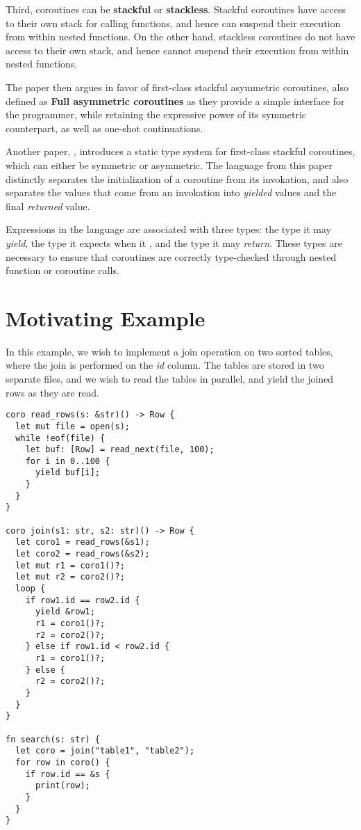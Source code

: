 \documentclass[review,twocolumn,preprint]{sigplanconf}
\begin{document}
Third, coroutines can be \textbf{stackful} or \textbf{stackless}. Stackful coroutines have access to their own stack for calling functions, and hence can suspend their execution from within nested functions. On the other hand, stackless coroutines do not have access to their own stack, and hence cannot suspend their execution from within nested functions.

The paper then argues in favor of first-class stackful asymmetric coroutines, also defined as \textbf{Full asymmetric coroutines} as they provide a simple interface for the programmer, while retaining the expressive power of its symmetric counterpart, as well as one-shot continuations.

Another paper, \citet{konrad2011}, introduces a static type system for first-class stackful coroutines, which can either be symmetric or asymmetric. The language from this paper distinctly separates the initialization of a coroutine from its invokation, and also separates the values that come from an invokation into \textit{yielded} values and the final \textit{returned} value.

Expressions in the language are associated with three types: the type it may \textit{yield}, the type it expects when it , and the type it may \textit{return}. These types are necessary to ensure that coroutines are correctly type-checked through nested function or coroutine calls.

\section{Motivating Example}



In this example, we wish to implement a join operation on two sorted tables, where the join is performed on the \textit{id} column. The tables are stored in two separate files, and we wish to read the tables in parallel, and yield the joined rows as they are read.

\begin{verbatim}
coro read_rows(s: &str)() -> Row {
  let mut file = open(s);
  while !eof(file) {
    let buf: [Row] = read_next(file, 100);
    for i in 0..100 {
      yield buf[i];
    }
  }
}

coro join(s1: str, s2: str)() -> Row {
  let coro1 = read_rows(&s1);
  let coro2 = read_rows(&s2);
  let mut r1 = coro1()?;
  let mut r2 = coro2()?;
  loop {
    if row1.id == row2.id {
      yield &row1;
      r1 = coro1()?;
      r2 = coro2()?;
    } else if row1.id < row2.id {
      r1 = coro1()?;
    } else {
      r2 = coro2()?;
    }
  }
}

fn search(s: str) {
  let coro = join("table1", "table2");
  for row in coro() {
    if row.id == &s {
      print(row);
    }
  }
}
\end{verbatim}
\end{document}
